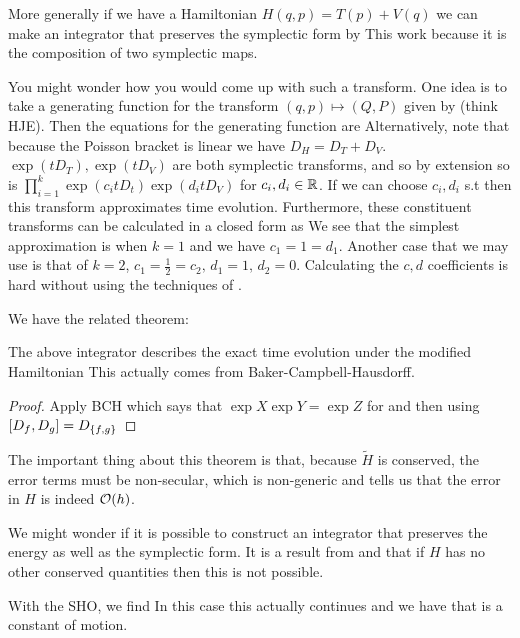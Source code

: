 \documentclass{article}
\begin{document}
More generally if we have a Hamiltonian $H(q,p) = T(p) + V(q)$ we can make an integrator that preserves the symplectic form by 
This work because it is the composition of two symplectic maps.
\begin{remark}
You might wonder how you would come up with such a transform. One idea is to take a generating function for the transform $(q,p) \mapsto (Q,P)$ given by 
(think HJE). Then the equations for the generating function are 
Alternatively, note that because the Poisson bracket is linear we have $D_H = D_T + D_V$. $\exp(tD_T),\exp(tD_V)$ are both symplectic transforms, and so by extension so is $\prod_{i=1}^k \exp(c_i t D_t)\exp(d_i t D_V)$ for $c_i,d_i \in \mbb{R}$. If we can choose $c_i,d_i$ s.t 
then this transform approximates time evolution. Furthermore, these constituent transforms can be calculated in a closed form as 
We see that the simplest approximation is when $k=1$ and we have $c_1=1=d_1$. Another case that we may use is that of $k=2$, $c_1 = \frac{1}{2} = c_2, \, d_1 = 1, \, d_2 = 0$. Calculating the $c,d$ coefficients is hard without using the techniques of \cite{Yoshida1990}.
\end{remark}
We have the related theorem:
\begin{theorem}[Yoshida, 1990]
	The above integrator describes the exact time evolution under the modified Hamiltonian 
This actually comes from Baker-Campbell-Hausdorff. 
\end{theorem}
\begin{proof}
Apply BCH which says that $\exp X \exp Y = \exp Z$ for 
and then using $\comm[D_f]{D_g} = D_{\acomm[f]{g}}$
\end{proof}

The important thing about this theorem is that, because $\tilde{H}$ is conserved, the error terms must be non-secular, which is non-generic and tells us that the error in $H$ is indeed $\mc{O}(h)$.
\begin{remark}
	We might wonder if it is possible to construct an integrator that preserves the energy as well as the symplectic form. It is a result from \cite{Zhong1988} and \cite{Ge1991} that if $H$ has no other conserved quantities then this is not possible. 
\end{remark}
\begin{example}
	With the SHO, we find 
In this case this actually continues and we have that 
is a constant of motion. 
\end{example}
\end{document}
